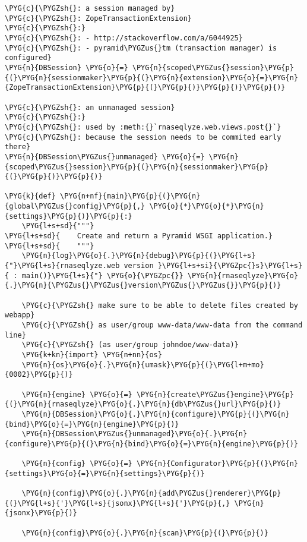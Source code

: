 \begin{Verbatim}[commandchars=\\\{\}]
\PYG{c}{\PYGZsh{}: a session managed by}
\PYG{c}{\PYGZsh{}: ZopeTransactionExtension}
\PYG{c}{\PYGZsh{}:}
\PYG{c}{\PYGZsh{}: - http://stackoverflow.com/a/6044925}
\PYG{c}{\PYGZsh{}: - pyramid\PYGZus{}tm (transaction manager) is configured}
\PYG{n}{DBSession} \PYG{o}{=} \PYG{n}{scoped\PYGZus{}session}\PYG{p}{(}\PYG{n}{sessionmaker}\PYG{p}{(}\PYG{n}{extension}\PYG{o}{=}\PYG{n}{ZopeTransactionExtension}\PYG{p}{(}\PYG{p}{)}\PYG{p}{)}\PYG{p}{)}

\PYG{c}{\PYGZsh{}: an unmanaged session}
\PYG{c}{\PYGZsh{}:}
\PYG{c}{\PYGZsh{}: used by :meth:{}`rnaseqlyze.web.views.post{}`}
\PYG{c}{\PYGZsh{}: because the session needs to be commited early there}
\PYG{n}{DBSession\PYGZus{}unmanaged} \PYG{o}{=} \PYG{n}{scoped\PYGZus{}session}\PYG{p}{(}\PYG{n}{sessionmaker}\PYG{p}{(}\PYG{p}{)}\PYG{p}{)}

\PYG{k}{def} \PYG{n+nf}{main}\PYG{p}{(}\PYG{n}{global\PYGZus{}config}\PYG{p}{,} \PYG{o}{*}\PYG{o}{*}\PYG{n}{settings}\PYG{p}{)}\PYG{p}{:}
    \PYG{l+s+sd}{"""}
\PYG{l+s+sd}{    Create and return a Pyramid WSGI application.}
\PYG{l+s+sd}{    """}
    \PYG{n}{log}\PYG{o}{.}\PYG{n}{debug}\PYG{p}{(}\PYG{l+s}{"}\PYG{l+s}{rnaseqlyze.web version }\PYG{l+s+si}{\PYGZpc{}s}\PYG{l+s}{ : main()}\PYG{l+s}{"} \PYG{o}{\PYGZpc{}} \PYG{n}{rnaseqlyze}\PYG{o}{.}\PYG{n}{\PYGZus{}\PYGZus{}version\PYGZus{}\PYGZus{}}\PYG{p}{)}

    \PYG{c}{\PYGZsh{} make sure to be able to delete files created by webapp}
    \PYG{c}{\PYGZsh{} as user/group www-data/www-data from the command line}
    \PYG{c}{\PYGZsh{} (as user/group johndoe/www-data)}
    \PYG{k+kn}{import} \PYG{n+nn}{os}
    \PYG{n}{os}\PYG{o}{.}\PYG{n}{umask}\PYG{p}{(}\PYG{l+m+mo}{0002}\PYG{p}{)}

    \PYG{n}{engine} \PYG{o}{=} \PYG{n}{create\PYGZus{}engine}\PYG{p}{(}\PYG{n}{rnaseqlyze}\PYG{o}{.}\PYG{n}{db\PYGZus{}url}\PYG{p}{)}
    \PYG{n}{DBSession}\PYG{o}{.}\PYG{n}{configure}\PYG{p}{(}\PYG{n}{bind}\PYG{o}{=}\PYG{n}{engine}\PYG{p}{)}
    \PYG{n}{DBSession\PYGZus{}unmanaged}\PYG{o}{.}\PYG{n}{configure}\PYG{p}{(}\PYG{n}{bind}\PYG{o}{=}\PYG{n}{engine}\PYG{p}{)}

    \PYG{n}{config} \PYG{o}{=} \PYG{n}{Configurator}\PYG{p}{(}\PYG{n}{settings}\PYG{o}{=}\PYG{n}{settings}\PYG{p}{)}

    \PYG{n}{config}\PYG{o}{.}\PYG{n}{add\PYGZus{}renderer}\PYG{p}{(}\PYG{l+s}{'}\PYG{l+s}{jsonx}\PYG{l+s}{'}\PYG{p}{,} \PYG{n}{jsonx}\PYG{p}{)}

    \PYG{n}{config}\PYG{o}{.}\PYG{n}{scan}\PYG{p}{(}\PYG{p}{)}


\end{Verbatim}
